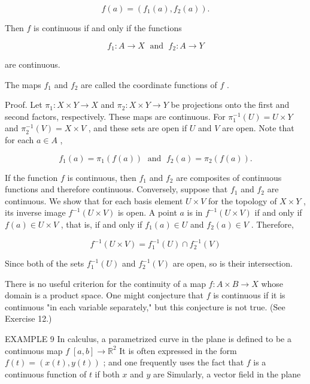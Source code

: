 \documentclass[10pt]{article}
\begin{document}
\[
f\left( a\right)  = \left( {{f}_{1}\left( a\right) ,{f}_{2}\left( a\right) }\right) .
\]

Then \(f\) is continuous if and only if the functions

\[
{f}_{1} : A \rightarrow  X\;\text{ and }\;{f}_{2} : A \rightarrow  Y
\]

are continuous.

The maps \({f}_{1}\) and \({f}_{2}\) are called the coordinate functions of \(f\) .

Proof. Let \({\pi }_{1} : X \times  Y \rightarrow  X\) and \({\pi }_{2} : X \times  Y \rightarrow  Y\) be projections onto the first and second factors, respectively. These maps are continuous. For \({\pi }_{1}^{-1}\left( U\right)  = U \times  Y\) and \({\pi }_{2}^{-1}\left( V\right)  = X \times  V\) , and these sets are open if \(U\) and \(V\) are open. Note that for each \(a \in  A\) ,

\[
{f}_{1}\left( a\right)  = {\pi }_{1}\left( {f\left( a\right) }\right) \;\text{ and }\;{f}_{2}\left( a\right)  = {\pi }_{2}\left( {f\left( a\right) }\right) .
\]

If the function \(f\) is continuous, then \({f}_{1}\) and \({f}_{2}\) are composites of continuous functions and therefore continuous. Conversely, suppose that \({f}_{1}\) and \({f}_{2}\) are continuous. We show that for each basis element \(U \times  V\) for the topology of \(X \times  Y\) , its inverse image \({f}^{-1}\left( {U \times  V}\right)\) is open. A point \(a\) is in \({f}^{-1}\left( {U \times  V}\right)\) if and only if \(f\left( a\right)  \in  U \times  V\) , that is, if and only if \({f}_{1}\left( a\right)  \in  U\) and \({f}_{2}\left( a\right)  \in  V\) . Therefore,

\[
{f}^{-1}\left( {U \times  V}\right)  = {f}_{1}^{-1}\left( U\right)  \cap  {f}_{2}^{-1}\left( V\right)
\]

Since both of the sets \({f}_{1}^{-1}\left( U\right)\) and \({f}_{2}^{-1}\left( V\right)\) are open, so is their intersection.

There is no useful criterion for the continuity of a map \(f : A \times  B \rightarrow  X\) whose domain is a product space. One might conjecture that \(f\) is continuous if it is continuous "in each variable separately," but this conjecture is not true. (See Exercise 12.)

EXAMPLE 9 In calculus, a parametrized curve in the plane is defined to be a continuous map \(f\;\left\lbrack  {a,b}\right\rbrack   \rightarrow  {\mathbb{R}}^{2}\) It is often expressed in the form \(f\left( t\right)  = \left( {x\left( t\right) ,y\left( t\right) }\right)\) ; and one frequently uses the fact that \(f\) is a continuous function of \(t\) if both \(x\) and \(y\) are Simularly, a vector field in the plane
\end{document}
